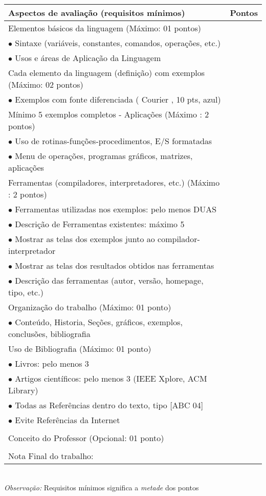 \begin{tabular}{|p{12cm}|c|}
    \hline
      \textbf{Aspectos de avaliação (requisitos mínimos)}
      &
      \textbf{Pontos} \\
    \hline
      Elementos básicos da linguagem (Máximo: 01 pontos)
      & \\
      $\bullet$ Sintaxe (variáveis, constantes, comandos, operações, etc.)
      & \\
      $\bullet$ Usos e áreas de Aplicação da Linguagem
      & \\
    \hline
      Cada elemento da linguagem (definição) com exemplos (Máximo: 02 pontos)
      & \\
      $\bullet$ Exemplos com fonte diferenciada ( Courier , 10 pts, azul)
      & \\
    \hline
      Mínimo 5 exemplos completos - Aplicações (Máximo : 2 pontos)
      & \\
      $\bullet$ Uso de rotinas-funções-procedimentos, E/S formatadas
      & \\
      $\bullet$ Menu de operações, programas gráficos, matrizes, aplicações
      & \\
    \hline
      Ferramentas (compiladores, interpretadores, etc.) (Máximo : 2 pontos)
      & \\
      $\bullet$ Ferramentas utilizadas nos exemplos: pelo menos DUAS
      & \\
      $\bullet$ Descrição de Ferramentas existentes:  máximo 5
      & \\
      $\bullet$ Mostrar as telas dos exemplos junto ao compilador-interpretador
      & \\
      $\bullet$ Mostrar as telas dos resultados obtidos nas ferramentas
      & \\
      $\bullet$ Descrição das ferramentas (autor, versão, homepage, tipo, etc.)
      & \\
    \hline
      Organização do trabalho (Máximo: 01 ponto)
      & \\
      $\bullet$ Conteúdo, Historia, Seções, gráficos, exemplos, conclusões, bibliografia
      & \\
    \hline
      Uso de Bibliografia (Máximo: 01 ponto)
      & \\
      $\bullet$ Livros: pelo menos 3
      & \\
      $\bullet$ Artigos científicos: pelo menos 3 (IEEE Xplore, ACM Library)
      & \\
      $\bullet$ Todas as Referências dentro do texto, tipo [ABC 04]
      & \\
      $\bullet$ Evite Referências da Internet
      & \\
    \hline
      & \\
      Conceito do Professor (Opcional: 01 ponto)
      & \\
    \hline
      & \\
      \hfill Nota Final do trabalho:
      & \\
    \hline
  \end{tabular}\\
  \textit{Observação:} Requisitos mínimos significa a \textit{metade} dos pontos
